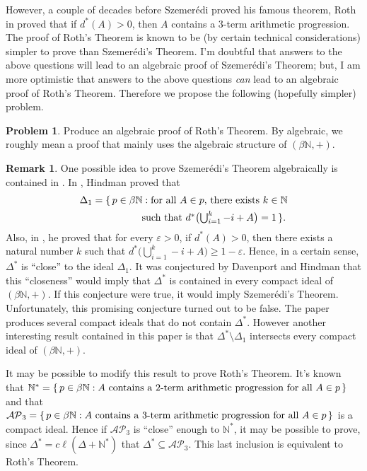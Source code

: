 \documentclass[12pt]{article}
\theoremstyle{plain}
\theoremstyle{definition}
\newtheorem{rmk}[thm]{Remark}
\newtheorem{prob}[thm]{Problem}
\newcommand{\bbN}{\mathbb{N}}
\begin{document}
However, a couple of decades before Szemer\'{e}di proved his famous
theorem, Roth in \cite{Roth:1953fk} proved that if $d^*(A) > 0$, then
$A$ contains a 3-term arithmetic progression. 
The proof of Roth's Theorem is known to be (by certain technical
considerations) simpler to prove than Szemer\'{e}di's Theorem. 
I'm doubtful that answers to the above questions will lead to an
algebraic proof of Szemer\'{e}di's Theorem; but, I am more optimistic that
answers to the above questions \textsl{can} lead to an algebraic proof
of Roth's Theorem.
Therefore we propose the following (hopefully simpler) problem.
\begin{prob}
  Produce an algebraic proof of Roth's Theorem.
  By algebraic, we roughly mean a proof that mainly uses the
  algebraic structure of $(\beta\bbN, +)$. 
\end{prob}
\begin{rmk}
  One possible idea to prove Szemer\'{e}di's Theorem algebraically is
  contained in \cite{Davenport:1987uq}.  
  In \cite[Theorem 3.8]{Hindman:1982zr}, Hindman proved that 
  \begin{align*}
    \Delta_1 &= \{\, p \in \beta\bbN: \hbox{for all $A \in p$, there
      exists $k \in \bbN$} \\
      &\hspace{5em}\hbox{such that $d^*\bigl(\bigcup_{i=1}^k
        -i+A\bigr) = 1$} \,\}.
  \end{align*}
  Also, in \cite[Theorem 3.8]{Hindman:1982fk}, he proved that for
  every $\varepsilon >0$, if $d^*(A) > 0$, then there exists a natural
  number $k$ such that $d^*\bigl(\bigcup_{i=1}^k -i+A \bigr) \ge 1 -
  \varepsilon$. 
  Hence, in a certain sense, $\Delta^*$ is ``close'' to the ideal
  $\Delta_1$. 
  It was conjectured by Davenport and Hindman that this ``closeness''
  would imply that $\Delta^*$ is contained in every compact ideal of
  $(\beta\bbN, +)$. 
  If this conjecture were true, it would imply Szemer\'{e}di's
  Theorem. 
  Unfortunately, this promising conjecture turned out to be
  false. 
  The paper \cite{Davenport:1987uq} produces several compact ideals
  that do not contain $\Delta^*$. 
  However another interesting result contained in this paper is that
  $\Delta^*\setminus\Delta_1$ intersects every compact ideal of
  $(\beta\bbN, +)$.

  It may be possible to modify this result to prove Roth's Theorem. 
  It's known that $\bbN^* = \{\, p \in \beta\bbN : \hbox{$A$ contains
    a 2-term arithmetic progression for all $A \in p$} \,\}$ and that
  $\mathcal{AP}_3 = \{\, p \in \beta\bbN : \hbox{$A$ contains a }
  \hbox{3-term arithmetic progression for all $A \in p$} \,\}$ is a
  compact ideal.
  Hence if $\mathcal{AP}_3$ is ``close'' enough to $\bbN^*$, it may be
  possible to prove, since $\Delta^* = c\ell(\Delta+\bbN^*)$ that
  $\Delta^* \subseteq  \mathcal{AP}_3$. 
  This last inclusion is equivalent to Roth's Theorem.
\end{rmk}
\end{document}

